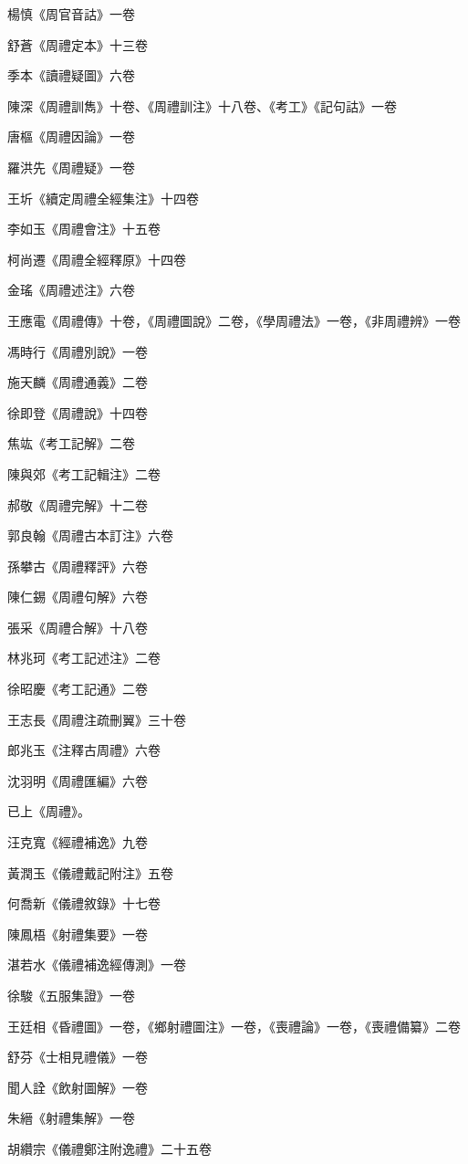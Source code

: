 楊慎《周官音詁》一卷

舒蒼《周禮定本》十三卷

季本《讀禮疑圖》六卷

陳深《周禮訓雋》十卷、《周禮訓注》十八卷、《考工》《記句詁》一卷

唐樞《周禮因論》一卷

羅洪先《周禮疑》一卷

王圻《續定周禮全經集注》十四卷

李如玉《周禮會注》十五卷

柯尚遷《周禮全經釋原》十四卷

金瑤《周禮述注》六卷

王應電《周禮傳》十卷，《周禮圖說》二卷，《學周禮法》一卷，《非周禮辨》一卷

馮時行《周禮別說》一卷

施天麟《周禮通義》二卷

徐即登《周禮說》十四卷

焦竑《考工記解》二卷

陳與郊《考工記輯注》二卷

郝敬《周禮完解》十二卷

郭良翰《周禮古本訂注》六卷

孫攀古《周禮釋評》六卷

陳仁錫《周禮句解》六卷

張采《周禮合解》十八卷

林兆珂《考工記述注》二卷

徐昭慶《考工記通》二卷

王志長《周禮注疏刪翼》三十卷

郎兆玉《注釋古周禮》六卷

沈羽明《周禮匯編》六卷

已上《周禮》。

汪克寬《經禮補逸》九卷

黃潤玉《儀禮戴記附注》五卷

何喬新《儀禮敘錄》十七卷

陳鳳梧《射禮集要》一卷

湛若水《儀禮補逸經傳測》一卷

徐駿《五服集證》一卷

王廷相《昏禮圖》一卷，《鄉射禮圖注》一卷，《喪禮論》一卷，《喪禮備纂》二卷

舒芬《士相見禮儀》一卷

聞人詮《飲射圖解》一卷

朱縉《射禮集解》一卷

胡纘宗《儀禮鄭注附逸禮》二十五卷

